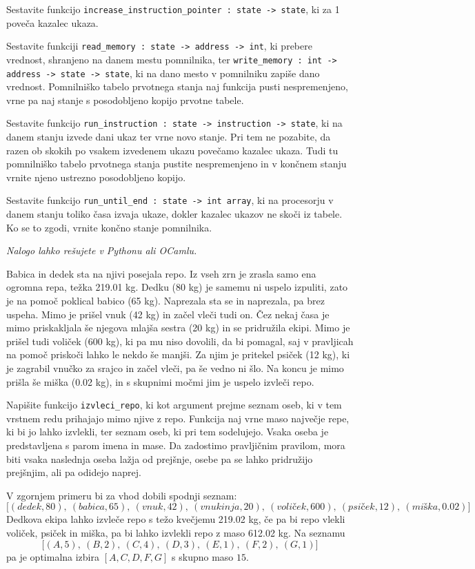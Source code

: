 \documentclass[arhiv]{../izpit}
\begin{document}
\podnaloga
Sestavite funkcijo \verb|increase_instruction_pointer : state -> state|,
ki za 1 poveča kazalec ukaza.

\podnaloga
Sestavite funkciji \verb|read_memory : state -> address -> int|, ki prebere vrednost, shranjeno na danem mestu pomnilnika, ter \verb|write_memory : int -> address -> state -> state|, ki na dano mesto v pomnilniku zapiše dano vrednost. Pomnilniško tabelo prvotnega stanja naj funkcija pusti nespremenjeno, vrne pa naj stanje s posodobljeno kopijo prvotne tabele.

\podnaloga
Sestavite funkcijo \verb|run_instruction : state -> instruction -> state|, ki na danem stanju izvede dani ukaz ter vrne novo stanje. Pri tem ne pozabite, da razen ob skokih po vsakem izvedenem ukazu povečamo kazalec ukaza. Tudi tu pomnilniško tabelo prvotnega stanja pustite nespremenjeno in v končnem stanju vrnite njeno ustrezno posodobljeno kopijo.

\podnaloga
Sestavite funkcijo \verb|run_until_end : state -> int array|, ki na procesorju v danem stanju toliko časa izvaja ukaze, dokler kazalec ukazov ne skoči iz tabele. Ko se to zgodi, vrnite končno stanje pomnilnika.


\naloga

\emph{Nalogo lahko rešujete v Pythonu ali OCamlu.}

Babica in dedek sta na njivi posejala repo. Iz vseh zrn je zrasla samo ena ogromna repa, težka 219.01 kg. Dedku (80 kg) je samemu ni uspelo izpuliti, zato je na pomoč poklical babico (65 kg). Naprezala sta se in naprezala, pa brez uspeha. Mimo je prišel vnuk (42 kg) in začel vleči tudi on. Čez nekaj časa je mimo priskakljala še njegova mlajša sestra (20 kg) in se pridružila ekipi. Mimo je prišel tudi voliček (600 kg), ki pa mu niso dovolili, da bi pomagal, saj v pravljicah na pomoč priskoči lahko le nekdo še manjši. Za njim je pritekel psiček (12 kg), ki je zagrabil vnučko za srajco in začel vleči, pa še vedno ni šlo. Na koncu je mimo prišla še miška (0.02 kg), in s skupnimi močmi jim je uspelo izvleči repo.

Napišite funkcijo \verb|izvleci_repo|, ki kot argument prejme seznam oseb, ki v tem vrstnem redu prihajajo mimo njive z repo. Funkcija naj vrne maso največje repe, ki bi jo lahko izvlekli, ter seznam oseb, ki pri tem sodelujejo. Vsaka oseba je predstavljena s parom imena in mase. Da zadostimo pravljičnim pravilom, mora biti vsaka naslednja oseba lažja od prejšnje, osebe pa se lahko pridružijo prejšnjim, ali pa odidejo naprej.

V zgornjem primeru bi za vhod dobili spodnji seznam:
\[
  \big[
    (\mathit{dedek}, 80),\ 
    (\mathit{babica}, 65),\ 
    (\mathit{vnuk}, 42),\ 
    (\mathit{vnukinja}, 20),\ 
    (\mathit{voliček}, 600),\ 
    (\mathit{psiček}, 12),\ 
    (\mathit{miška}, 0.02)
  \big]
\]
Dedkova ekipa lahko izvleče repo s težo kvečjemu 219.02 kg, če pa bi repo vlekli voliček, psiček in miška, pa bi lahko izvlekli repo z maso 612.02 kg. Na seznamu
\[
  \big[
    (A, 5),\ 
    (B, 2),\ 
    (C, 4),\ 
    (D, 3),\ 
    (E, 1),\ 
    (F, 2),\ 
    (G, 1)
  \big]
\]
pa je optimalna izbira $[A, C, D, F, G]$ s skupno maso $15$. 
\end{document}
